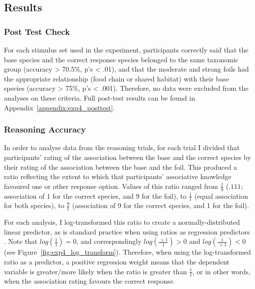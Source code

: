 
\subsection{Results}

\subsubsection{Post Test Check}

For each stimulus set used in the experiment,
participants correctly said that the base species
and the correct response species 
belonged to the same taxonomic group (accuracy > 70.5\%, p's < .01),
and that the moderate and strong foils
had the appropriate relationship (food chain or shared habitat)
with their base species (accuracy > 75\%, p's < .001).
Therefore, no data were excluded from the analyses on these criteria.
Full post-test results can be found in Appendix~\ref{appendix:exp4_posttest}.

\subsubsection{Reasoning Accuracy}

In order to analyse data from the reasoning trials,
for each trial I divided that participants' rating of
the association between the base and the correct species
by their rating of the association between the base and the foil.
This produced a ratio reflecting the extent to which
that participants' associative knowledge
favoured one or other response option.
Values of this ratio ranged from $\frac{1}{9}$
($.111$; association of 1 for the correct species, and 9 for the foil),
to $\frac{1}{1}$ (equal association for both species),
to $\frac{9}{1}$
(association of 9 for the correct species, and 1 for the foil).

For each analysis, I log-transformed this ratio
to create a normally-distributed linear predictor,
as is standard practice when using ratios as regression predictors \citep{Gelman2007}.
Note that $log(\frac{1}{1}) = 0$,
and correspondingly $log(\frac{>1}{1}) > 0$ and $log(\frac{1}{>1}) < 0$
(see Figure~\ref{fig:exp4_log_transform}).
Therefore, when using the log-transformed ratio as a predictor,
a positive regression weight means that
the dependent variable is greater/more likely when the ratio is greater than $\frac{1}{1}$,
or in other words, when the association rating favours the correct response.

